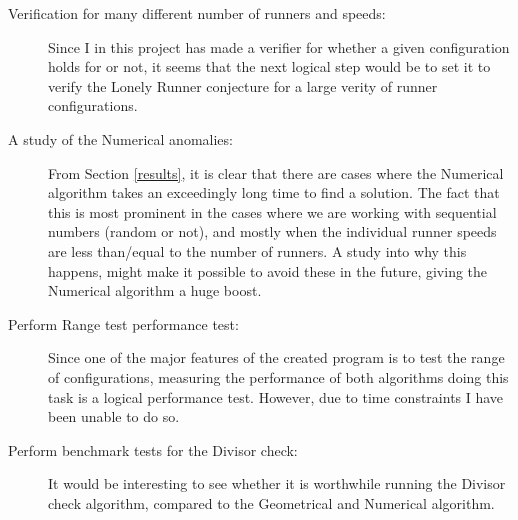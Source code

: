 \begin{description}
\item[Verification for many different number of runners and speeds:] Since I in this project has made a verifier for whether a given configuration holds for  or not, it seems that the next logical step would be to set it to verify the Lonely Runner conjecture for a large verity of runner configurations. 

\item[A study of the Numerical anomalies:] From Section \ref{results}, it is clear that there are cases where the Numerical algorithm takes an exceedingly long time to find a solution. The fact that this is most prominent in the cases where we are working with sequential numbers (random or not), and mostly when the individual runner speeds are less than/equal to the number of runners. A study into why this happens, might make it possible to avoid these in the future, giving the Numerical algorithm a huge boost.

\item[Perform Range test performance test:] Since one of the major features of the created program is to test the range of configurations, measuring the performance of both algorithms doing this task is a logical performance test. However, due to time constraints I have been unable to do so.

\item[Perform benchmark tests for the Divisor check:] It would be interesting to see whether it is worthwhile running the Divisor check algorithm, compared to the Geometrical and Numerical algorithm.
\end{description}
